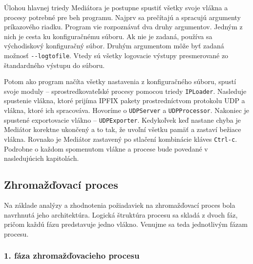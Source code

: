 Úlohou hlavnej triedy Mediátora je postupne spustiť všetky svoje vlákna a procesy potrebné pre beh 
programu. Najprv sa prečítajú a spracujú argumenty príkazového riadku. Program vie rozpoznávať dva druhy 
argumentov. Jedným z nich je cesta ku konfiguračnému súboru. Ak nie je zadaná, používa sa východiskový 
konfiguračný súbor. Druhým argumentom môže byť zadaná možnosť \verb|--logtofile|. Vtedy sú všetky 
logovacie výstupy presmerované zo štandardného výstupu do súboru.

Potom ako program načíta všetky nastavenia z konfiguračného súboru, spustí svoje moduly -- 
sprostredkovateľské procesy pomocou triedy \verb|IPLoader|. Nasleduje spustenie vlákna, ktoré prijíma 
IPFIX pakety prostredníctvom protokolu UDP a vlákna, ktoré ich spracováva. Hovoríme o \verb|UDPServer| 
a \verb|UDPProcessor|. Nakoniec je spustené exportovacie vlákno -- \verb|UDPExporter|. Kedykoľvek keď 
nastane chyba je Mediátor korektne ukončený a to tak, že uvoľní všetku pamäť a zastaví bežiace vlákna. 
Rovnako je Mediátor zastavený po stlačení kombinácie kláves \verb|Ctrl-c|.
Podrobne o každom spomenutom vlákne a procese bude povedané v nasledujúcich kapitolách.







\subsection{Zhromažďovací proces} \label{sec:collectingprocess}

Na základe analýzy a zhodnotenia požiadaviek na zhromažďovací proces bola navrhnutá jeho architektúra.
Logická štruktúra procesu sa skladá z dvoch fáz, pričom každú fázu predstavuje jedno vlákno. 
Venujme sa teda jednotlivým fázam procesu.

\subsubsection{1. fáza zhromažďovacieho procesu}

